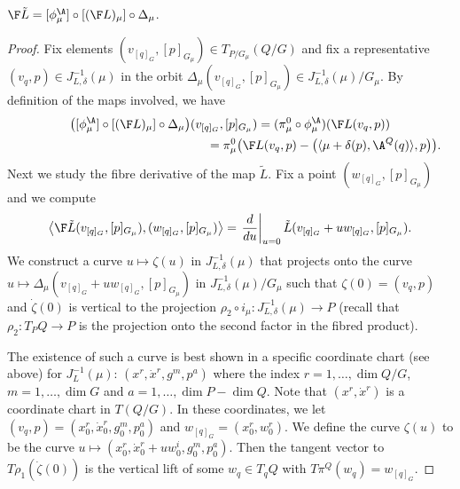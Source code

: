 \begin{lemma}\label{lem:legendre}
  $\F \tilde L=[\phi^\A_\mu]\circ[(\F L)_\mu]\circ\Delta_\mu$.
\end{lemma}
\begin{proof}
Fix elements $(v_{[q]_G},[p]_{G_\mu})\in T_{P/G_\mu}(Q/G)$ and f\/ix a representative $(v_q,p)\in J^{-1}_{L,\delta}(\mu)$ in the orbit $\Delta_\mu(v_{[q]_G},[p]_{G_\mu})\in J^{-1}_{L,\delta}(\mu)/G_\mu$. By def\/inition of the maps involved, we have
\begin{gather*}
\big([\phi^\A_\mu]\circ[(\F L)_\mu]\circ\Delta_\mu\big)(v_{[q]_G},[p]_{G_\mu})   = (\pi^0_\mu \circ \phi^\A_\mu)(\F L(v_q,p))\\
 \phantom{\big([\phi^\A_\mu]\circ[(\F L)_\mu]\circ\Delta_\mu\big)(v_{[q]_G},[p]_{G_\mu})}{}
 = \pi^0_\mu\big(\F L(v_q,p)-\big(\langle \mu+\delta(p),\A^Q(q)\rangle,p\big)\big).
\end{gather*}
Next we study the f\/ibre derivative of the map $\tilde L$.  Fix a point $(w_{[q]_G},[p]_{G_\mu})$ and we compute
\[
\left\langle \F\tilde L (v_{[q]_G},[p]_{G_\mu}) , (w_{[q]_G},[p]_{G_\mu})\right\rangle=\left. \frac{d}{du}\right|_{u=0}\tilde L (v_{[q]_G}+u w_{[q]_G},[p]_{G_\mu}).
\]
We construct a curve $u\mapsto \zeta(u)$ in $J^{-1}_{L,\delta}(\mu)$ that projects onto the curve $u\mapsto\Delta_\mu(v_{[q]_G}+u w_{[q]_G},[p]_{G_\mu})$ in $J^{-1}_{L,\delta}(\mu)/G_\mu$ such that $\zeta(0)=(v_q,p)$ and $\dot \zeta(0)$ is vertical to the projection $\rho_2\circ i_\mu:J^{-1}_{L,\delta}(\mu)\to P$ (recall that $\rho_2: T_PQ\to P$ is the projection onto the second factor in the f\/ibred product).

The existence of such a curve is best shown in a specif\/ic coordinate chart (see above) for $J^{-1}_L(\mu)$: $(x^r,\dot x^r, g^m,p^a)$  where the index $r=1,\ldots,\dim Q/G$, $m=1,\ldots,\dim G$ and $a=1,\ldots ,\dim P-\dim Q$. Note that $(x^r,\dot x^r)$ is a coordinate chart in $T(Q/G)$.
In these coordinates, we let $(v_q,p)=(x^r_0,\dot x^r_0,g^m_0,p^a_0)$ and $w_{[q]_G}=(x^r_0, w^r_0)$. We def\/ine the curve $\zeta(u)$ to be the curve $u\mapsto (x^r_0,\dot x^r_0+u w^i_0,g^m_0,p^a_0)$. Then the tangent vector to $T\rho_1(\dot \zeta(0))$ is the vertical lift of some $w_q\in T_qQ$ with $T\pi^Q(w_q)=w_{[q]_G}$.


\end{proof}
